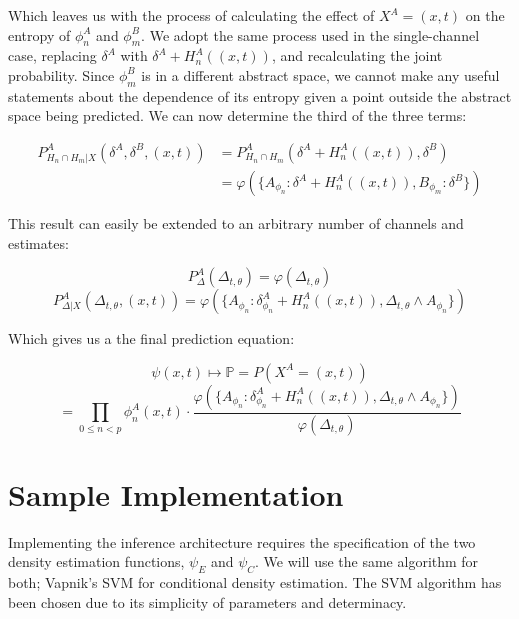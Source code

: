 \documentclass[10pt]{article}
\begin{document}
Which leaves us with the process of calculating the effect of \(X^A = (x,t) \) on the entropy of \(\phi_n^A \) and \(\phi_m^B \).  We adopt the same process used in the single-channel case, replacing \(\delta^A \) with \(\delta^A + H_n^A((x,t)) \), and recalculating the joint probability. Since \(\phi_m^B \) is in a different abstract space, we cannot make any useful statements about the dependence of its entropy given a point outside the abstract space being predicted.  We can now determine the third of the three terms:

\begin{align}
P_{H_n \cap H_m | X}^A \left( \delta^A, \delta^B, (x,t) \right) &= P_{H_n \cap H_m}^A \left( \delta^A + H_n^A((x,t)), \delta^B \right) \nonumber \\
&= \varphi \left( \{ A_{\phi_n}:\delta^A + H_n^A((x,t)), B_{\phi_m}: \delta^B \} \right)
\end{align}

This result can easily be extended to an arbitrary number of channels and estimates:

\begin{equation} P_\Delta^A \left( \Delta_{t,\theta} \right) = \varphi \left( \Delta_{t,\theta} \right) \end{equation}
\begin{equation} P_{\Delta|X}^A \left( \Delta_{t,\theta}, (x,t) \right) = \varphi \left( \{ A_{\phi_n} : \delta_{\phi_n}^A + H_n^A((x,t)), \Delta_{t,\theta} \land A_{\phi_n} \} \right) \end{equation}

Which gives us a the final prediction equation:

\[ \psi(x,t) \mapsto \mathbb{P} = P(X^A = (x,t) ) \]
\begin{equation} 
= \prod_{0 \le n < p} \phi_n^A( x, t) \cdot \frac{ \varphi \left( \{ A_{\phi_n} : \delta_{\phi_n}^A + H_n^A((x,t)), \Delta_{t,\theta} \land A_{\phi_n} \} \right) }{ \varphi( \Delta_{t,\theta} ) }
\end{equation}

\section{Sample Implementation}
Implementing the inference architecture requires the specification of the two density estimation functions, \( \psi_E \) and \( \psi_C \).  We will use the same algorithm for both; Vapnik's SVM for conditional density estimation.  The SVM algorithm has been chosen due to its simplicity of parameters and determinacy. 
\end{document}
